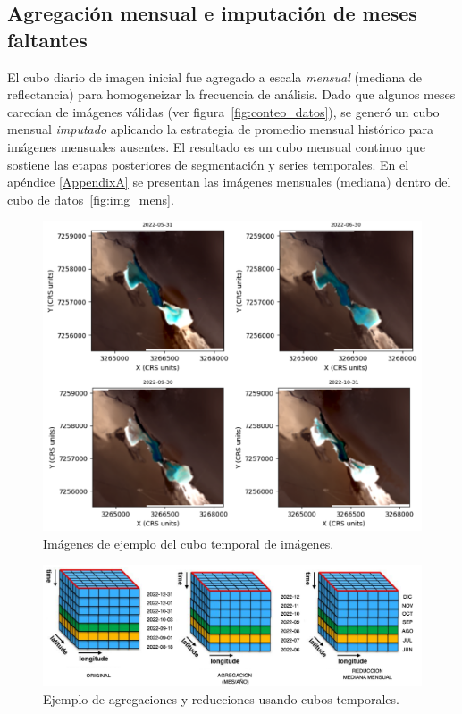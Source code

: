 \subsection{Agregación mensual e imputación de meses faltantes}
El cubo diario de imagen inicial fue agregado a escala \emph{mensual} (mediana de reflectancia) para homogeneizar la frecuencia de análisis. Dado que algunos meses carecían de imágenes válidas (ver figura~\ref{fig:conteo_datos}), se generó un cubo mensual \emph{imputado} aplicando la estrategia de promedio mensual histórico para imágenes mensuales ausentes. El resultado es un cubo mensual continuo que sostiene las etapas posteriores de segmentación y series temporales. En el apéndice \ref{AppendixA} se presentan las imágenes mensuales (mediana) dentro del cubo de datos~\ref{fig:img_mens}.


\begin{figure}[ht]
        \centering
        \includegraphics[scale=.25]
        {Figures/agg_mens.png}
        \caption{Imágenes de ejemplo del cubo temporal de imágenes.}
        \label{fig:agg_mens}
\end{figure}

\begin{figure}[ht]
        \centering
        \includegraphics[scale=.25]
        {Figures/cube.png}
        \caption{Ejemplo de agregaciones y reducciones usando cubos temporales.}
        \label{fig:img_mens_agg}
\end{figure}




